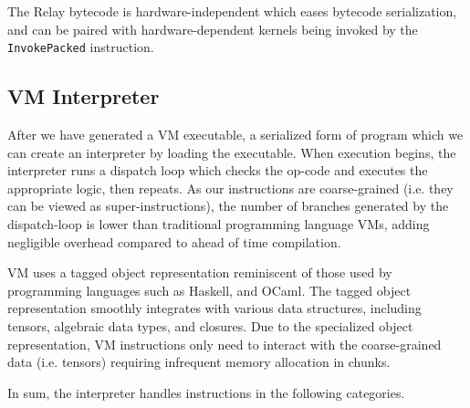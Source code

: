 The Relay bytecode is hardware-independent which eases bytecode serialization, and can be paired with hardware-dependent kernels being invoked by the \texttt{InvokePacked} instruction.

\subsection{VM Interpreter}

After we have generated a VM executable, a serialized form of program which
we can create an interpreter by loading the executable. When execution begins, the interpreter runs a dispatch loop which checks the op-code and executes the appropriate logic, then repeats. As our instructions are coarse-grained (i.e. they can be viewed as super-instructions), the number of branches generated by the dispatch-loop is lower than traditional programming language VMs, adding negligible overhead compared to ahead of time compilation.

VM uses a tagged object representation reminiscent of those used by programming languages such as Haskell, and OCaml. The tagged object representation smoothly integrates with various data structures, including tensors, algebraic data types, and closures. Due to the specialized object representation, VM instructions only need to interact with the coarse-grained data (i.e. tensors) requiring infrequent memory allocation in chunks.

In sum, the interpreter handles instructions in the following categories.

